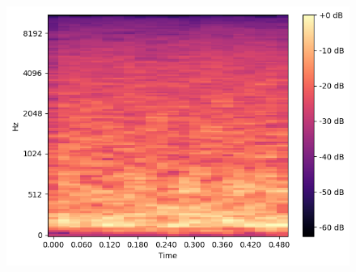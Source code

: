 \begin{figure}[t]
\begin{minipage}[b]{0.3\hsize}
        \includegraphics[width=\hsize]{img/melspec/salad.png}
    \end{minipage}

    \hspace{0.3cm}


\end{figure}
